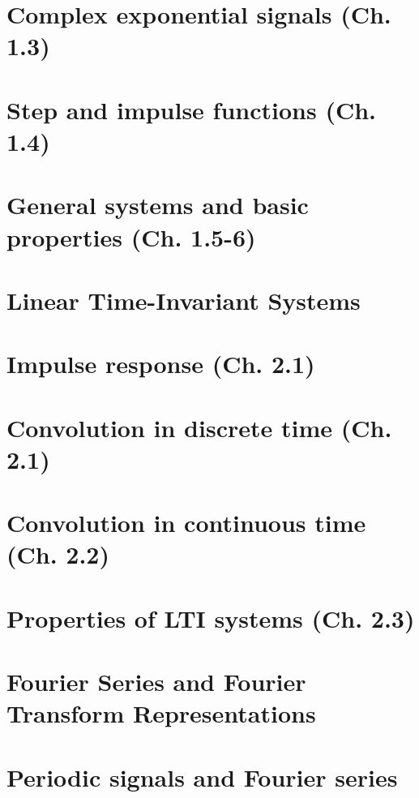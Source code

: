 \documentclass{article}
\begin{document}
\section{Complex exponential signals (Ch. 1.3)}


\section{Step and impulse functions (Ch. 1.4)}


\section{General systems and basic properties (Ch. 1.5-6)}


\section*{Linear Time-Invariant Systems}
\section{Impulse response (Ch. 2.1)}


\section{Convolution in discrete time (Ch. 2.1)}


\section{Convolution in continuous time (Ch. 2.2)}


\section{Properties of LTI systems (Ch. 2.3)} %


\section*{Fourier Series and Fourier Transform Representations}
\section{Periodic signals and Fourier series}
\end{document}
